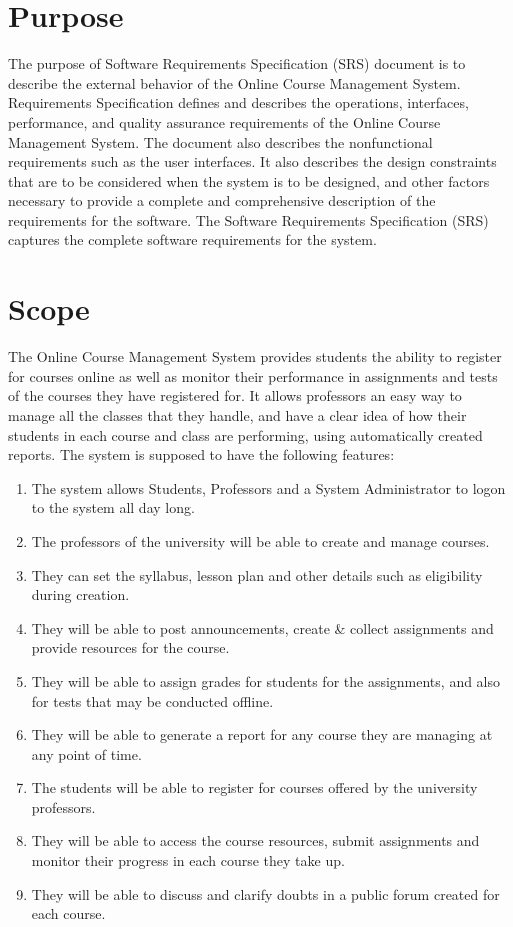 \documentclass[12pt, a4]{report}
\begin{document}
\section{Purpose}
The purpose of Software Requirements Specification (SRS) document is to describe the external behavior of the Online Course Management System. Requirements Specification defines and describes the operations, interfaces, performance, and quality assurance requirements of the Online Course Management System. The document also describes the nonfunctional requirements such as the user interfaces.
It also describes the design constraints that are to be considered when the system is to be designed, and other factors necessary to provide a complete and comprehensive description of the requirements for the software. The Software Requirements Specification (SRS) captures the complete software requirements for the system.


\section{Scope}
The Online Course Management System provides students the ability to register for courses online as well as monitor their performance in assignments and tests of the courses they have registered for. It allows professors an easy way to manage all the classes that they handle, and have a clear idea of how their students in each course and class are performing, using automatically created reports.
The system is supposed to have the following features:

\begin{enumerate}
    \item The system allows Students, Professors and a System Administrator to logon to the system all day long.
    \item The professors of the university will be able to create and manage courses.
    \item They can set the syllabus, lesson plan and other details such as eligibility during creation.
    \item They will be able to post announcements, create \& collect assignments and provide resources for the course.
    \item They will be able to assign grades for students for the assignments, and also for tests that may be conducted offline.
    \item They will be able to generate a report for any course they are managing at any point of time.
    \item The students will be able to register for courses offered by the university professors.
    \item They will be able to access the course resources, submit assignments and monitor their progress in each course they take up.
    \item They will be able to discuss and clarify doubts in a public forum created for each course.
\end{enumerate}
\end{document}
